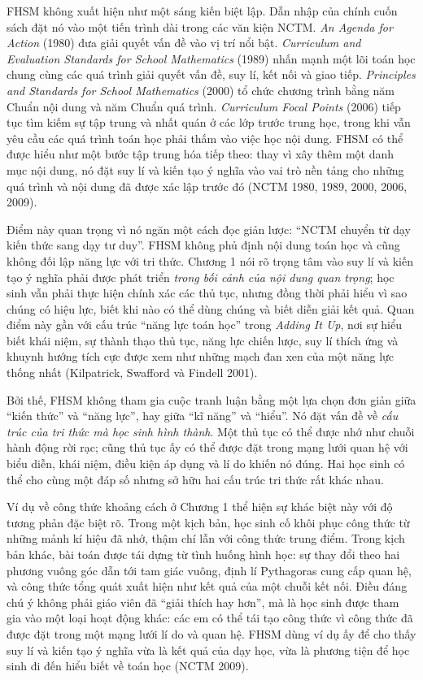 FHSM không xuất hiện như một sáng kiến biệt lập. Dẫn nhập của chính cuốn sách
đặt nó vào một tiến trình dài trong các văn kiện NCTM. \emph{An Agenda for
Action} (1980) đưa giải quyết vấn đề vào vị trí nổi bật. \emph{Curriculum and
Evaluation Standards for School Mathematics} (1989) nhấn mạnh một lõi toán
học chung cùng các quá trình giải quyết vấn đề, suy lí, kết nối và giao tiếp.
\emph{Principles and Standards for School Mathematics} (2000) tổ chức chương
trình bằng năm Chuẩn nội dung và năm Chuẩn quá trình. \emph{Curriculum Focal
Points} (2006) tiếp tục tìm kiếm sự tập trung và nhất quán ở các lớp trước
trung học, trong khi vẫn yêu cầu các quá trình toán học phải thấm vào việc học
nội dung. FHSM có thể được hiểu như một bước tập trung hóa tiếp theo: thay vì
xây thêm một danh mục nội dung, nó đặt suy lí và kiến tạo ý nghĩa vào vai trò
nền tảng cho những quá trình và nội dung đã được xác lập trước đó
(NCTM 1980, 1989, 2000, 2006, 2009).

Điểm này quan trọng vì nó ngăn một cách đọc giản lược: ``NCTM chuyển từ dạy
kiến thức sang dạy tư duy''. FHSM không phủ định nội dung toán học và cũng
không đối lập năng lực với tri thức. Chương 1 nói rõ trọng tâm vào suy lí và
kiến tạo ý nghĩa phải được phát triển \emph{trong bối cảnh của nội dung quan
trọng}; học sinh vẫn phải thực hiện chính xác các thủ tục, nhưng đồng thời
phải hiểu vì sao chúng có hiệu lực, biết khi nào có thể dùng chúng và biết
diễn giải kết quả. Quan điểm này gần với cấu trúc ``năng lực toán học'' trong
\emph{Adding It Up}, nơi sự hiểu biết khái niệm, sự thành thạo thủ tục, năng
lực chiến lược, suy lí thích ứng và khuynh hướng tích cực được xem như những
mạch đan xen của một năng lực thống nhất (Kilpatrick, Swafford và Findell
2001).

Bởi thế, FHSM không tham gia cuộc tranh luận bằng một lựa chọn đơn giản giữa
``kiến thức'' và ``năng lực'', hay giữa ``kĩ năng'' và ``hiểu''. Nó đặt vấn đề
về \emph{cấu trúc của tri thức mà học sinh hình thành}. Một thủ tục có thể
được nhớ như chuỗi hành động rời rạc; cũng thủ tục ấy có thể được đặt trong
mạng lưới quan hệ với biểu diễn, khái niệm, điều kiện áp dụng và lí do khiến
nó đúng. Hai học sinh có thể cho cùng một đáp số nhưng sở hữu hai cấu trúc
tri thức rất khác nhau.

Ví dụ về công thức khoảng cách ở Chương 1 thể hiện sự khác biệt này với độ
tương phản đặc biệt rõ. Trong một kịch bản, học sinh cố khôi phục công thức từ
những mảnh kí hiệu đã nhớ, thậm chí lẫn với công thức trung điểm. Trong kịch
bản khác, bài toán được tái dựng từ tình huống hình học: sự thay đổi theo hai
phương vuông góc dẫn tới tam giác vuông, định lí Pythagoras cung cấp quan hệ,
và công thức tổng quát xuất hiện như kết quả của một chuỗi kết nối. Điều đáng
chú ý không phải giáo viên đã ``giải thích hay hơn'', mà là học sinh được tham
gia vào một loại hoạt động khác: các em có thể tái tạo công thức vì công thức
đã được đặt trong một mạng lưới lí do và quan hệ. FHSM dùng ví dụ ấy để cho
thấy suy lí và kiến tạo ý nghĩa vừa là kết quả của dạy học, vừa là phương
tiện để học sinh đi đến hiểu biết về toán học (NCTM 2009).

